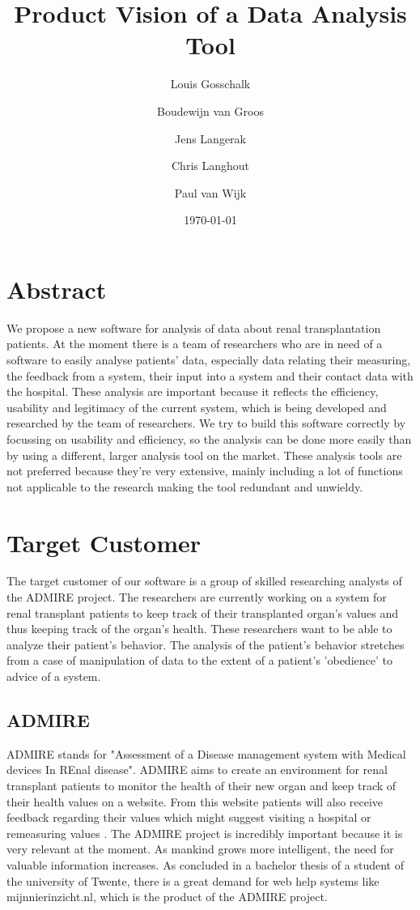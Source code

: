 \documentclass[a4paper]{article}
\title{Product Vision of a Data Analysis Tool}
\author[1]{Louis Gosschalk}
\author[2]{Boudewijn van Groos}
\author[3]{Jens Langerak}
\author[4]{Chris Langhout}
\author[5]{Paul van Wijk}
\affil[1]{lgosschalk \\
4214528}
\affil[2]{bvangroos \\
4229843}
\affil[3]{jlangerak \\
4317327}
\affil[4]{clanghout \\
4281705}
\affil[5]{pvanwijk \\
4285034}
\affil[ ]{Health Informatics Group C}
\date{\today}
\begin{document}
\maketitle

\section*{Abstract}
We propose a new software for analysis of data about renal transplantation patients. At the moment there is a team of researchers who are in need of a software to easily analyse patients' data, especially data relating their measuring, the feedback from a system, their input into a system and their contact data with the hospital. These analysis are important because it reflects the efficiency, usability and legitimacy of the current system, which is being developed and researched by the team of researchers. We try to build this software correctly by focussing on usability and efficiency, so the analysis can be done more easily than by using a different, larger analysis tool on the market. These analysis tools are not preferred because they're very extensive, mainly including a lot of functions not applicable to the research making the tool redundant and unwieldy. 

\newpage

\tableofcontents

\newpage

\section{Target Customer}
The target customer of our software is a group of skilled researching analysts of the ADMIRE project. The researchers are currently working on a system for renal transplant patients to keep track of their transplanted organ's values and thus keeping track of the organ's health. These researchers want to be able to analyze their patient's behavior. The analysis of the patient's behavior stretches from a case of manipulation of data to the extent of a patient's 'obedience' to advice of a system. 

\subsection{ADMIRE}
ADMIRE stands for "Assessment of a Disease management system with Medical devices In REnal disease". ADMIRE aims to create an environment for renal transplant patients to monitor the health of their new organ and keep track of their health values on a website. From this website patients will also receive feedback regarding their values which might suggest visiting a hospital or remeasuring values \cite{Admire}. The ADMIRE project is incredibly important because it is very relevant at the moment. As mankind grows more intelligent, the need for valuable information increases. As concluded in a bachelor thesis of a student of the university of Twente, there is a great demand for web help systems \cite{twente} like mijnnierinzicht.nl, which is the product of the ADMIRE project.
\end{document}
